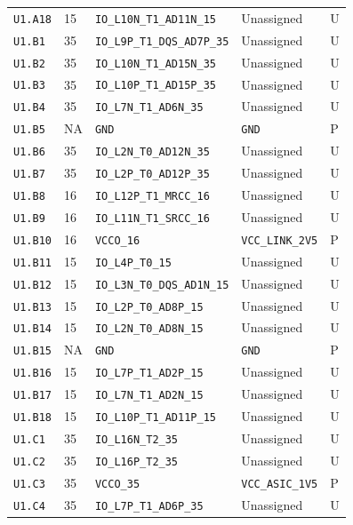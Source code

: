 \documentclass[11pt,a4paper]{article}
\begin{document}
\begin{longtable}{@{}P{20mm}P{10mm}P{75mm}P{49mm}P{7mm}@{}}
\nolinkurl{U1.A18} & 15 & \nolinkurl{IO_L10N_T1_AD11N_15} & Unassigned & U \\
\nolinkurl{U1.B1} & 35 & \nolinkurl{IO_L9P_T1_DQS_AD7P_35} & Unassigned & U \\
\nolinkurl{U1.B2} & 35 & \nolinkurl{IO_L10N_T1_AD15N_35} & Unassigned & U \\
\nolinkurl{U1.B3} & 35 & \nolinkurl{IO_L10P_T1_AD15P_35} & Unassigned & U \\
\nolinkurl{U1.B4} & 35 & \nolinkurl{IO_L7N_T1_AD6N_35} & Unassigned & U \\
\nolinkurl{U1.B5} & NA & \nolinkurl{GND} & \nolinkurl{GND} & P \\
\nolinkurl{U1.B6} & 35 & \nolinkurl{IO_L2N_T0_AD12N_35} & Unassigned & U \\
\nolinkurl{U1.B7} & 35 & \nolinkurl{IO_L2P_T0_AD12P_35} & Unassigned & U \\
\nolinkurl{U1.B8} & 16 & \nolinkurl{IO_L12P_T1_MRCC_16} & Unassigned & U \\
\nolinkurl{U1.B9} & 16 & \nolinkurl{IO_L11N_T1_SRCC_16} & Unassigned & U \\
\nolinkurl{U1.B10} & 16 & \nolinkurl{VCCO_16} & \nolinkurl{VCC_LINK_2V5} & P \\
\nolinkurl{U1.B11} & 15 & \nolinkurl{IO_L4P_T0_15} & Unassigned & U \\
\nolinkurl{U1.B12} & 15 & \nolinkurl{IO_L3N_T0_DQS_AD1N_15} & Unassigned & U \\
\nolinkurl{U1.B13} & 15 & \nolinkurl{IO_L2P_T0_AD8P_15} & Unassigned & U \\
\nolinkurl{U1.B14} & 15 & \nolinkurl{IO_L2N_T0_AD8N_15} & Unassigned & U \\
\nolinkurl{U1.B15} & NA & \nolinkurl{GND} & \nolinkurl{GND} & P \\
\nolinkurl{U1.B16} & 15 & \nolinkurl{IO_L7P_T1_AD2P_15} & Unassigned & U \\
\nolinkurl{U1.B17} & 15 & \nolinkurl{IO_L7N_T1_AD2N_15} & Unassigned & U \\
\nolinkurl{U1.B18} & 15 & \nolinkurl{IO_L10P_T1_AD11P_15} & Unassigned & U \\
\nolinkurl{U1.C1} & 35 & \nolinkurl{IO_L16N_T2_35} & Unassigned & U \\
\nolinkurl{U1.C2} & 35 & \nolinkurl{IO_L16P_T2_35} & Unassigned & U \\
\nolinkurl{U1.C3} & 35 & \nolinkurl{VCCO_35} & \nolinkurl{VCC_ASIC_1V5} & P \\
\nolinkurl{U1.C4} & 35 & \nolinkurl{IO_L7P_T1_AD6P_35} & Unassigned & U \\

\end{longtable}
\end{document}
